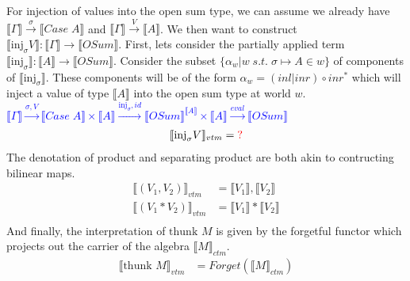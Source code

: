 \documentclass{article}
\newcommand{\den}[1]{\llbracket #1 \rrbracket}
\newcommand{\blue}[1]{\textcolor{blue}{#1}}
\newcommand{\red}[1]{\textcolor{red}{#1}}
\newcommand{\thunk}[1]{\textrm{thunk }#1}
\newcommand{\injj}[2]{\textrm{inj}_{#1}#2}
\begin{document}
For injection of values into the open sum type, we can assume we already have $\den{\Gamma} \xrightarrow{\sigma} \den{Case \; A}$ and $\den{\Gamma} \xrightarrow{V} \den{A}$. We then want to construct $\den{\injj{\sigma}{V}} : \den{\Gamma} \rightarrow \den{OSum}$. First, lets consider the partially applied term $\den{\injj \sigma } : \den{A} \rightarrow \den{OSum}$. Consider the subset $\{ \alpha_w | w \;s.t.\; \sigma \mapsto A \in w \}$ of components of $\den{\injj \sigma }$. These components will be of the form $\alpha_w = (inl | inr) \circ inr^*$ which will inject a value of type $\den{A}$ into the open sum type at world $w$. \blue{$\den{\Gamma} \xrightarrow{\sigma, V} \den{Case \; A} \times \den{A} \xrightarrow{\injj \sigma , id} \den{OSum}^{\den{A}} \times \den{A} \xrightarrow{eval} \den{OSum}$}
\begin{align*}
    \llbracket  \injj{\sigma}{V}\rrbracket_{vtm} &= \red{?}\\
\end{align*}
The denotation of product and separating product are both akin to contructing bilinear maps.
\begin{align*}
    \llbracket  (V_1, V_2)\rrbracket_{vtm} &= \den{V_1} , \den{V_2}\\
    \llbracket  (V_1 * V_2)\rrbracket_{vtm} &= \den{V_1} * \den{V_2}\\
\end{align*}
And finally, the interpretation of $\thunk{M}$ is given by the forgetful functor which projects out the carrier of the algebra $\den{M}_{ctm}$.
\begin{align*}
    \llbracket  \thunk{M}\rrbracket_{vtm} &= Forget(\den{M}_{ctm})\\
\end{align*}
\end{document}
